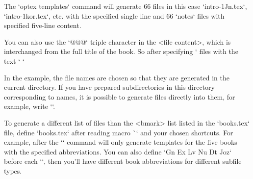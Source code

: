{{{{{{{\begtt



\endfile


\endfile
\endtt
%
The `optex templates` command will generate 66 files in this case
`intro-1Jn.tex`, `intro-1kor.tex`, etc. with the specified single line
and 66 `notes` files with specified five-line content.

You can also use the `@@@` triple character in the <file content>, which is interchanged from
the full title of the book. So after specifying `%
files with the text `%
`%

In the example, the file names are chosen so that they are generated in the current
directory. If you have prepared subdirectories in this directory corresponding to
names, it is possible to generate files directly into them, for example, write
``.

To generate a different list of files than the <bmark> list
listed in the `books.tex` file, define `books.tex` after reading
macro \`\genbooks` and your chosen shortcuts. For example, after
\begtt
\def\genbooks {Gn Ex Lv Nu Dt Joz}
\endtt
%
the `\filegen` command will only generate templates for the five books with the specified
abbreviations. You can also define `\genbooks` before each `\filegen`, then
you'll have different book abbreviations for different subfile types.


}}}}}}}
